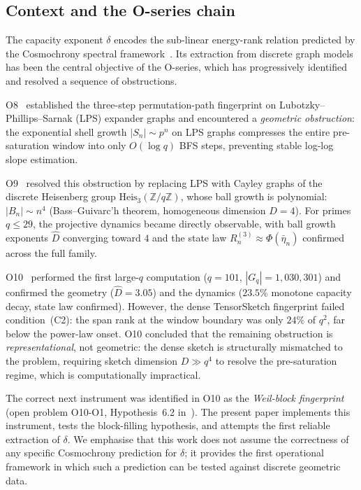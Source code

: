 \documentclass[11pt,a4paper]{article}
\newcommand{\Heis}{\mathrm{Heis}_3(\mathbb{Z}/q\mathbb{Z})}
\begin{document}
  \subsection{Context and the O-series chain}
    \label{sec:intro-context}

    The capacity exponent $\delta$ encodes the sub-linear energy-rank relation predicted by the
    Cosmochrony spectral framework~\cite{Cosmochrony}.
    Its extraction from discrete graph models has been the central objective of the O-series, which
    has progressively identified and resolved a sequence of obstructions.

    O8~\cite{Beau2026a12} established the three-step permutation-path fingerprint on
    Lubotzky--Phillips--Sarnak (LPS) expander graphs and encountered a \emph{geometric
  obstruction}: the exponential shell growth $|S_n| \sim p^n$ on LPS graphs compresses the
    entire pre-saturation window into only $O(\log q)$ BFS steps, preventing stable log-log slope
    estimation.

    O9~\cite{Beau2026a13} resolved this obstruction by replacing LPS with Cayley graphs of the
    discrete Heisenberg group $\Heis$, whose ball growth is polynomial:
    $|B_n| \sim n^4$ (Bass--Guivarc'h theorem, homogeneous dimension $D = 4$).
    For primes $q \leq 29$, the projective dynamics became directly observable, with ball growth
    exponents $\hat{D}$ converging toward $4$ and the state law $R_n^{(3)} \approx \Phi(\bar\eta_n)$
    confirmed across the full family.

    O10~\cite{Beau2026a14} performed the first large-$q$ computation ($q = 101$,
    $|G_q| = 1{,}030{,}301$) and confirmed the geometry ($\hat{D} = 3.05$) and the dynamics
    ($23.5\%$ monotone capacity decay, state law confirmed).
    However, the dense TensorSketch fingerprint failed condition~(C2): the span rank at the window
    boundary was only $24\%$ of $q^2$, far below the power-law onset.
    O10 concluded that the remaining obstruction is \emph{representational}, not geometric:
    the dense sketch is structurally mismatched to the problem, requiring sketch dimension
    $D \gg q^4$ to resolve the pre-saturation regime, which is computationally impractical.

    The correct next instrument was identified in O10 as the \emph{Weil-block fingerprint}
    (open problem O10-O1, Hypothesis~6.2 in~\cite{Beau2026a14}).
    The present paper implements this instrument, tests the block-filling hypothesis, and attempts
    the first reliable extraction of $\delta$.
    We emphasise that this work does not assume the correctness of any specific Cosmochrony
    prediction for $\delta$; it provides the first operational framework in which such a prediction
    can be tested against discrete geometric data.
\end{document}
